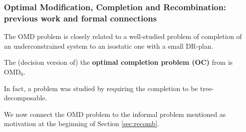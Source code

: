 %
\subsubsection{Optimal Modification, Completion and Recombination: previous work and formal
connections}
%
The OMD problem is closely related to a well-studied problem of completion of an underconstrained system to an isostatic one with a small DR-plan.
\begin{observation}\label{obs:OC_to_OMD}
    The (decision version of) the \textbf{optimal completion problem (OC)} from \cite{sitharam2005combinatorial,joan-arinyo2003transforming,zhang-gao2006well} is OMD$_0$.
\end{observation}
In fact, a  problem was studied by \cite{joan-arinyo2003transforming} requiring the completion to be tree-decomposable.

We now connect the OMD problem to the informal  problem mentioned as motivation at the beginning of Section \ref{sec:recomb}.

